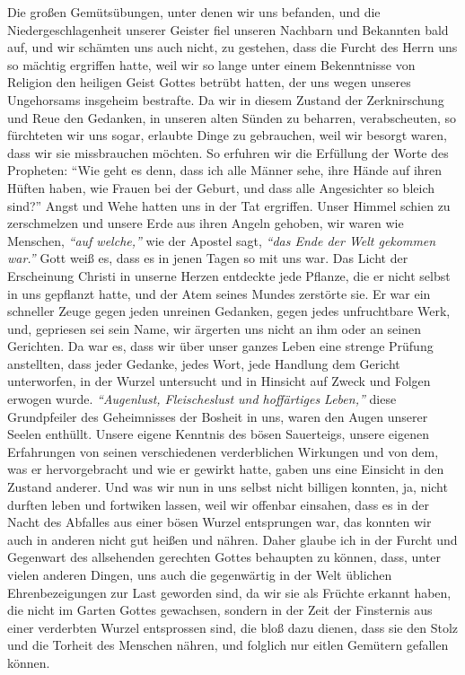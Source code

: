 Die großen Gemütsübungen, unter denen wir uns
befanden,
und die
Niedergeschlagenheit unserer Geister fiel unseren Nachbarn und Bekannten bald
auf, und wir schämten uns auch nicht, zu gestehen, dass die Furcht des Herrn uns
so mächtig ergriffen hatte, weil wir so lange unter einem Bekenntnisse von
Religion den heiligen Geist Gottes betrübt hatten, der uns wegen unseres
Ungehorsams insgeheim bestrafte. Da wir in
diesem
Zustand der Zerknirschung
und Reue den Gedanken, in unseren alten Sünden zu beharren, verabscheuten, so
fürchteten wir uns sogar, erlaubte Dinge zu gebrauchen, weil wir besorgt waren,
dass wir sie missbrauchen möchten. So erfuhren wir die Erfüllung der Worte des
Propheten:
"`Wie geht es denn, dass ich alle Männer sehe, ihre Hände auf ihren
Hüften haben, wie Frauen bei der Geburt, und dass alle Angesichter so bleich
sind?"'
Angst und Wehe hatten uns in der Tat ergriffen.
Unser Himmel schien zu zerschmelzen und unsere Erde aus ihren Angeln gehoben,
wir waren wie Menschen, \textit{"`auf welche,"'} wie der Apostel sagt,
\textit{"`das Ende der Welt gekommen war."'} Gott weiß es,
dass es in jenen Tagen so mit uns war. Das
Licht der Erscheinung Christi in unserne Herzen entdeckte jede Pflanze, die er
nicht selbst in uns gepflanzt hatte, und der Atem seines Mundes zerstörte sie.
Er war ein schneller Zeuge gegen jeden unreinen
Gedanken, gegen jedes
unfruchtbare Werk, und, gepriesen sei sein Name, wir ärgerten uns nicht an ihm
oder an seinen Gerichten. Da war es, dass wir über unser
ganzes Leben eine
strenge Prüfung anstellten, dass jeder
Gedanke, jedes Wort, jede Handlung dem
Gericht unterworfen, in der Wurzel untersucht und in Hinsicht auf Zweck und
Folgen erwogen wurde.
\textit{"`Augenlust, Fleischeslust und hoffärtiges Leben,"'}
diese Grundpfeiler des Geheimnisses der Bosheit
in uns, waren den Augen unserer Seelen enthüllt. Unsere eigene Kenntnis des
bösen Sauerteigs, unsere eigenen Erfahrungen von seinen
verschiedenen
verderblichen Wirkungen und von dem, was er hervorgebracht und wie er gewirkt
hatte, gaben uns eine Einsicht in den Zustand anderer. Und was wir nun in uns
selbst nicht billigen konnten, ja, nicht durften leben und fortwiken lassen,
weil
wir offenbar einsahen, dass es in der Nacht des Abfalles aus einer bösen Wurzel
entsprungen war, das konnten wir auch in anderen nicht gut heißen und nähren.
Daher glaube ich in der Furcht und Gegenwart des allsehenden gerechten Gottes
behaupten zu können, dass, unter vielen anderen Dingen, uns auch die gegenwärtig
in der Welt üblichen Ehrenbezeigungen zur Last geworden sind, da wir sie als
Früchte erkannt haben, die nicht im Garten Gottes
gewachsen, sondern in der Zeit
der Finsternis aus einer verderbten Wurzel
entsprossen sind, die bloß dazu
dienen, dass sie den Stolz und die Torheit des Menschen nähren, und folglich nur
eitlen Gemütern gefallen können.

